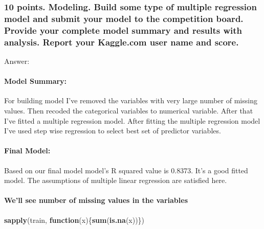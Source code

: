 \documentclass[]{article}
\newenvironment{Shaded}{\begin{snugshade}}{\end{snugshade}}
\newcommand{\ControlFlowTok}[1]{\textcolor[rgb]{0.13,0.29,0.53}{\textbf{#1}}}
\newcommand{\KeywordTok}[1]{\textcolor[rgb]{0.13,0.29,0.53}{\textbf{#1}}}
\newcommand{\NormalTok}[1]{#1}
\let\oldparagraph\paragraph
\renewcommand{\paragraph}[1]{\oldparagraph{#1}\mbox{}}
\begin{document}
\hypertarget{points.-modeling.-build-some-type-of-multiple-regression-model-and-submit-your-model-to-the-competition-board.-provide-your-complete-model-summary-and-results-with-analysis.-report-your-kaggle.com-user-name-and-score.}{%
\subsubsection{10 points. Modeling. Build some type of multiple
regression model and submit your model to the competition board. Provide
your complete model summary and results with analysis. Report your
Kaggle.com user name and
score.}\label{points.-modeling.-build-some-type-of-multiple-regression-model-and-submit-your-model-to-the-competition-board.-provide-your-complete-model-summary-and-results-with-analysis.-report-your-kaggle.com-user-name-and-score.}}

Answer:

\hypertarget{model-summary}{%
\paragraph{Model Summary:}\label{model-summary}}

For building model I've removed the variables with very large number of
missing values. Then recoded the categorical variables to numerical
variable. After that I've fitted a multiple regression model. After
fitting the multiple regression model I've used step wise regression to
select best set of predictor variables.

\hypertarget{final-model}{%
\paragraph{Final Model:}\label{final-model}}

Based on our final model model's R squared value is 0.8373. It's a good
fitted model. The assumptions of multiple linear regression are
satisfied here.

\hypertarget{well-see-number-of-missing-values-in-the-variables}{%
\paragraph{We'll see number of missing values in the
variables}\label{well-see-number-of-missing-values-in-the-variables}}

\begin{Shaded}
\begin{Highlighting}[]
\KeywordTok{sapply}\NormalTok{(train, }\ControlFlowTok{function}\NormalTok{(x)\{}\KeywordTok{sum}\NormalTok{(}\KeywordTok{is.na}\NormalTok{(x))\})}
\end{Highlighting}
\end{Shaded}
\end{document}
